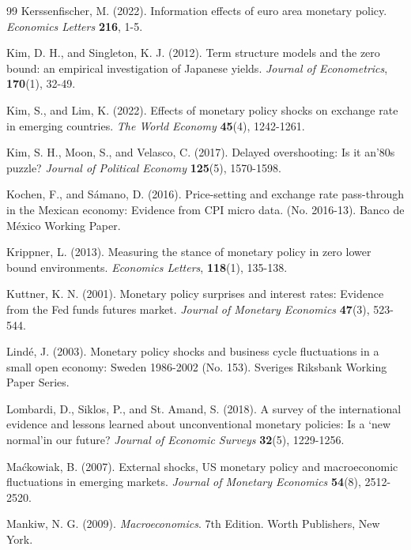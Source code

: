 \documentclass[12pt, reqno]{article}
\begin{document}
\begin{thebibliography}{99}
\bibitem{} \hypertarget{Kerssenfischer (2022)}{} Kerssenfischer, M. (2022). Information effects of euro area monetary policy. \textit{Economics Letters} \textbf{216}, 1-5.

\bibitem{} \hypertarget{Kim and Singleton (2012)}{} Kim, D. H., and Singleton, K. J. (2012). Term structure models and the zero bound: an empirical investigation of Japanese yields. \textit{Journal of Econometrics}, \textbf{170}(1), 32-49.

\bibitem{} \hypertarget{Kim and Lim (2022)}{}Kim, S., and Lim, K. (2022). Effects of monetary policy shocks on exchange rate in emerging countries. \textit{The World Economy} \textbf{45}(4), 1242-1261.

\bibitem{} \hypertarget{Kim et al. (2017)}{}Kim, S. H., Moon, S., and Velasco, C. (2017). Delayed overshooting: Is it an’80s puzzle? \textit{Journal of Political Economy} \textbf{125}(5), 1570-1598.

\bibitem{} \hypertarget{Kochen and Sámano (2016)}{} 
Kochen, F., and Sámano, D. (2016). Price-setting and exchange rate pass-through in the Mexican economy: Evidence from CPI micro data. (No. 2016-13). Banco de México Working Paper.

\bibitem{} \hypertarget{Krippner (2013)}{} Krippner, L. (2013). Measuring the stance of monetary policy in zero lower bound environments. \textit{Economics Letters}, \textbf{118}(1), 135-138.

\bibitem{} \hypertarget{Kuttner (2001)}{} Kuttner, K. N. (2001). Monetary policy surprises and interest rates: Evidence from the Fed funds futures market. \textit{Journal of Monetary Economics} \textbf{47}(3), 523-544.

\bibitem{} \hypertarget{Linde (2003)}{}Lindé, J. (2003). Monetary policy shocks and business cycle fluctuations in a small open economy: Sweden 1986-2002 (No. 153). Sveriges Riksbank Working Paper Series.

\bibitem{} \hypertarget{Lombardi et al. (2018)}{}
Lombardi, D., Siklos, P., and St. Amand, S. (2018). A survey of the international evidence and lessons learned about unconventional monetary policies: Is a ‘new normal’in our future? \textit{Journal of Economic Surveys} \textbf{32}(5), 1229-1256.

\bibitem{} \hypertarget{Mackowiak (2007)}{} Maćkowiak, B. (2007). External shocks, US monetary policy and macroeconomic fluctuations in emerging markets. \textit{Journal of Monetary Economics} \textbf{54}(8), 2512-2520.

\bibitem{} \hypertarget{Mankiw (2009)}{}
Mankiw, N. G. (2009). \textit{Macroeconomics}. 7th Edition. Worth Publishers, New York.


\end{thebibliography}
\end{document}
